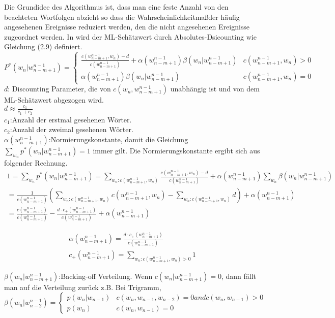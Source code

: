 Die Grundidee des Algorithmus ist, dass man eine feste Anzahl von den beachteten Wortfolgen abzieht so dass die Wahrscheinlichkeitma\ss der h\"aufig angesehenen Ereignisse reduziert werden, den die nicht angesehenen Ereignisse zugeordnet werden. In \cite{ars_script} wird der ML-Sch\"atzwert durch Absolutes-Dsicounting wie Gleichung (2.9) definiert.
\begin{equation}
P^{*}(w_{n}|w_{n-m+1}^{n-1})=\begin{cases}
\frac{c(w_{n-m+1}^{n-1},w_{n})-d}{c(w_{n-m+1}^{n-1})}+\alpha (w_{n-m+1}^{n-1})\beta (w_{n}|w_{n-m+1}^{n-1}) & c(w_{n-m+1}^{n-1},w_{n})>0 \\
\alpha (w_{n-m+1}^{n-1})\beta (w_{n}|w_{n-m+1}^{n-1}) & c(w_{n-m+1}^{n-1},w_{n})=0 
\end{cases}
\end{equation}
$d$: Discounting Parameter, die von $c(w_{n},w_{n-m+1}^{n-1})$ unabh\"angig ist und von dem ML-Sch\"atzwert abgezogen wird.\\
$d\approx \frac{c_{1}}{c_{1}+c_{2}}$ \\
$c_{1}$:Anzahl der erstmal gesehenen W\"orter.\\
$c_{2}$:Anzahl der zweimal gesehenen W\"orter.\\
$\alpha (w_{n-m+1}^{n-1})$:Normierungskonstante, damit die Gleichung $\sum_{w_{n}}p^{*}(w_{n}|w_{n-m+1}^{n-1})=1$ immer gilt. Die Normierungskonstante ergibt sich aus folgender Rechnung.
\begin{multline}
1=\sum_{w_{n}}p^{*}(w_{n}|w_{n-m+1}^{n-1})=\sum_{w_{n}:c(w_{n-m+1}^{n-1},w_{n})}\frac{c(w_{n-m+1}^{n-1},w_{n})-d}{c(w_{n-m+1}^{n-1})}+\alpha (w_{n-m+1}^{n-1})\sum_{w_{n}}\beta (w_{n}|w_{n-m+1}^{n-1})\\
=\frac{1}{c(w_{n-m+1}^{n-1})}(\sum_{w_{n}:c(w_{n-m+1}^{n-1},w_{n})}c(w_{n-m+1}^{n-1},w_{n})-\sum_{w_{n}:c(w_{n-m+1}^{n-1},w_{n})}d)+\alpha (w_{n-m+1}^{n-1})\\
=\frac{c(w_{n-m+1}^{n-1})}{c(w_{n-m+1}^{n-1})}-\frac{d\cdot c_{+}(w_{n-m+1}^{n-1})}{c(w_{n-m+1}^{n-1})}+\alpha (w_{n-m+1}^{n-1})
\end{multline}

\begin{gather}
\alpha (w_{n-m+1}^{n-1})=\frac{d\cdot c_{+}(w_{n-m+1}^{n-1})}{c(w_{n-m+1}^{n-1})}\\
c_{+}(w_{n-m+1}^{n-1})=\sum_{w_{n}:c(w_{n-m+1}^{n-1},w_{n})>0}1
\end{gather}


$\beta (w_{n}|w_{n-m+1}^{n-1})$:Backing-off Verteilung. Wenn $c(w_{n}|w_{n-m+1}^{n-1})=0$, dann f\"allt man auf die Verteilung zur\"uck
z.B. Bei Trigramm,\\

\begin{equation}
\beta (w_{n}|w_{n-2}^{n-1})=\begin{cases}
p(w_{n}|w_{n-1}) & c(w_{n},w_{n-1},w_{n-2})=0 and c(w_{n},w_{n-1})>0 \\
p(w_{n}) & c(w_{n},w_{n-1})=0 
\end{cases}
\end{equation}

